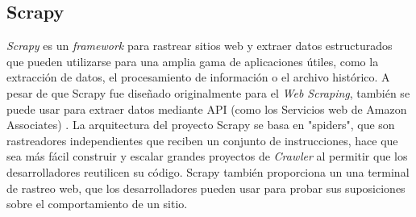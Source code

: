 \subsection{Scrapy}
\textit{Scrapy} es un \textit{framework} para rastrear sitios web y extraer datos estructurados que pueden utilizarse para una amplia 
gama de aplicaciones útiles, como la extracción de datos, el procesamiento de información o el archivo histórico.
A pesar de que Scrapy fue diseñado originalmente para el \textit{Web Scraping}, también se puede usar para extraer datos mediante 
API (como los Servicios web de Amazon Associates) \citep{CTScrapy}.
La arquitectura del proyecto Scrapy se basa en "spiders", que son rastreadores independientes que reciben un conjunto de instrucciones,
hace que sea más fácil construir y escalar grandes proyectos de \textit{Crawler} al permitir que los desarrolladores reutilicen su 
código. Scrapy también proporciona un una terminal de rastreo web, que los desarrolladores pueden usar para probar sus suposiciones 
sobre el comportamiento de un sitio.
